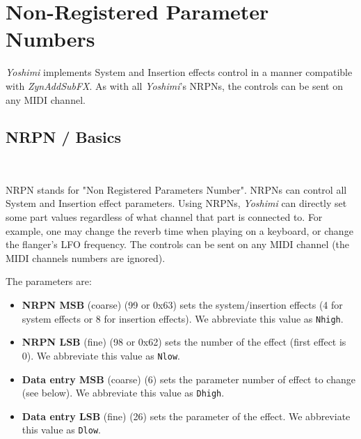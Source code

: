 %
%
%

\section{Non-Registered Parameter Numbers}
\label{sec:nrpns}

   \textsl{Yoshimi} implements System and Insertion effects control in a
   manner compatible with \textsl{ZynAddSubFX}. As with all
   \textsl{Yoshimi}'s NRPNs, the controls can be sent on any MIDI channel.

\subsection{NRPN / Basics}
\label{subsection:nrpns_midi_nrpn_basics}\

   NRPN stands for "Non Registered Parameters Number".
   NRPNs can control all System and Insertion effect parameters.
   Using NRPNs, \textsl{Yoshimi} can directly set some part values
   regardless of what channel that part is connected to.  For example, one
   may change the reverb time when playing on a keyboard, or
   change the flanger's LFO frequency.
   The controls can be sent on any MIDI channel
   (the MIDI channels numbers are ignored).

   The parameters are:

   \begin{itemize}
      \item \textbf{NRPN MSB}
      (coarse) (99 or 0x63) sets the system/insertion effects
      (4 for system effects or 8 for insertion effects).
      We abbreviate this value as \texttt{Nhigh}.
      \item \textbf{NRPN LSB}
      (fine) (98 or 0x62) sets the number of the effect (first
      effect is 0).
      We abbreviate this value as \texttt{Nlow}.
      \item \textbf{Data entry MSB}
      (coarse) (6) sets the parameter number of effect to
      change (see below).
      We abbreviate this value as \texttt{Dhigh}.
      \item \textbf{Data entry LSB}
      (fine) (26) sets the parameter of the effect.
      We abbreviate this value as \texttt{Dlow}.
   \end{itemize}

